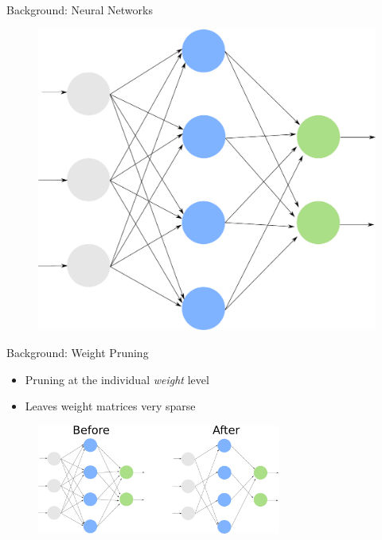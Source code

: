 \documentclass[xcolor=dvipsnames]{beamer}
\begin{document}
\begin{frame}{Background: Neural Networks}

\begin{figure}
    \centering
    \includegraphics[width=0.6\linewidth]{images/neural_network.pdf}
\end{figure}
\end{frame}



\begin{frame}{Background: Weight Pruning}

\begin{itemize}
    \item Pruning at the individual \textit{weight} level
    \item Leaves weight matrices very sparse
\end{itemize}

\begin{figure}
    \centering
    \includegraphics[width=8cm]{images/weight_pruning.pdf}
\end{figure}

\end{frame}
\end{document}
